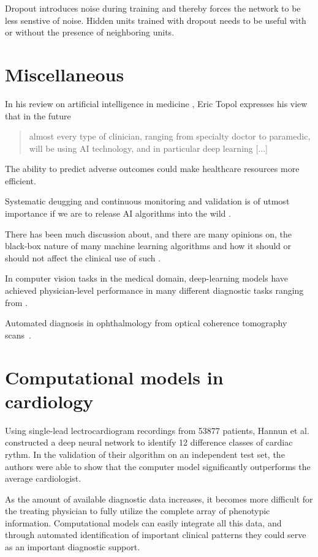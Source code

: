 Dropout introduces noise during training
and thereby forces the network to be less senstive of noise.
Hidden units trained with dropout needs to be useful 
with or without the presence of neighboring units.


\section{Miscellaneous}

In his review on artificial intelligence in medicine%
\autocite{topolHighperformance2019}, 
Eric Topol expresses his view that in the future
\blockquote{%
almost every type of clinician, ranging from specialty doctor to paramedic,
will be using AI technology, and in particular deep learning [...]
}.

The ability to predict adverse outcomes could make  
healthcare resources more efficient.

Systematic deugging and continuous monitoring and validation 
is of utmost importance if we are to release AI algorithms into the wild%
\autocite{topolHighperformance2019}.

There has been much discussion about, and there are many opinions on, 
the black-box nature of many machine learning algorithms and 
how it should or should not affect the clinical use of such 
\autocite{topolHighperformance2019, gunningXAI2019, vanderveldenExplainable2022}.

In computer vision tasks in the medical domain,
deep-learning models have achieved physician-level performance
in many different diagnostic tasks
ranging from .

Automated diagnosis in ophthalmology 
from optical coherence tomography scans~\autocite{defauwClinically2018}.

\section{Computational models in cardiology}

Using single-lead lectrocardiogram recordings from \num{53877} patients,
Hannun et al.\autocite{hannunCardiologistlevel2019}
constructed a deep neural network
to identify 12 difference classes of cardiac rythm.
In the validation of their algorithm on an independent test set,
the authors were able to show that the computer model
significantly outperforms the average cardiologist. 

As the amount of available diagnostic data increases,
it becomes more difficult for the treating physician
to fully utilize the complete array of phenotypic information.
Computational models can easily integrate all this data,
and through automated identification of important clinical patterns
they could serve as an important diagnostic support.

